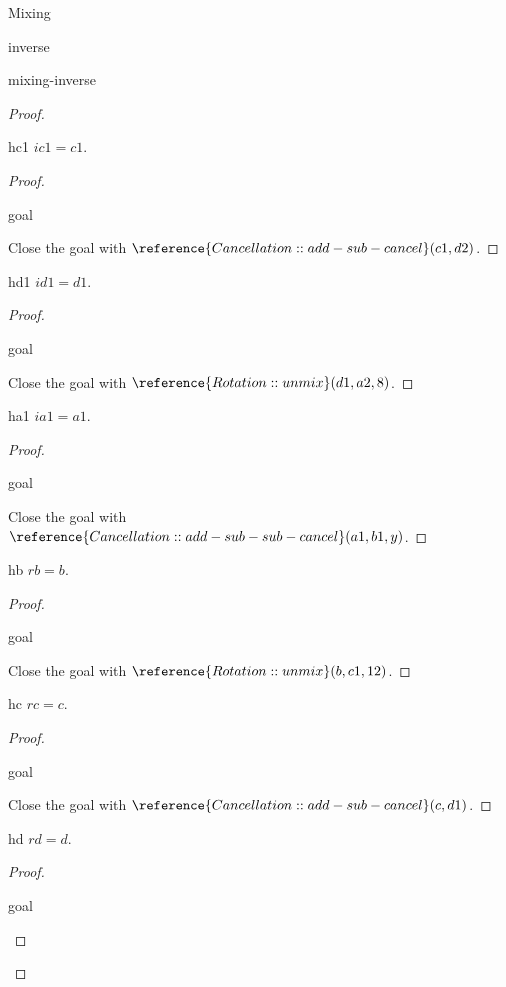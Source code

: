\begin{lexlean}{Mixing}
\begin{section}{inverse}
\begin{theorem}{mixing-inverse}
\begin{proof}
\begin{have}{hc1}
  \(ic1 = c1\).
  \begin{proof}
  \begin{rewrite}{goal}
  \end{rewrite}
  Close the goal with \(\reference{Cancellation::add-sub-cancel}(c1, d2)\).
  \end{proof}
  \end{have}
  \begin{have}{hd1}
  \(id1 = d1\).
  \begin{proof}
  \begin{rewrite}{goal}
  \end{rewrite}
  Close the goal with \(\reference{Rotation::unmix}(d1, a2, 8)\).
  \end{proof}
  \end{have}
  \begin{have}{ha1}
  \(ia1 = a1\).
  \begin{proof}
  \begin{rewrite}{goal}
  \end{rewrite}
  Close the goal with \(\reference{Cancellation::add-sub-sub-cancel}(a1, b1, y)\).
  \end{proof}
  \end{have}
  \begin{have}{hb}
  \(rb = b\).
  \begin{proof}
  \begin{rewrite}{goal}
  \end{rewrite}
  Close the goal with \(\reference{Rotation::unmix}(b, c1, 12)\).
  \end{proof}
  \end{have}
  \begin{have}{hc}
  \(rc = c\).
  \begin{proof}
  \begin{rewrite}{goal}
  \end{rewrite}
  Close the goal with \(\reference{Cancellation::add-sub-cancel}(c, d1)\).
  \end{proof}
  \end{have}
  \begin{have}{hd}
  \(rd = d\).
  \begin{proof}
  \begin{rewrite}{goal}
  \end{rewrite}

\end{proof}
\end{have}
\end{proof}
\end{theorem}
\end{section}
\end{lexlean}
